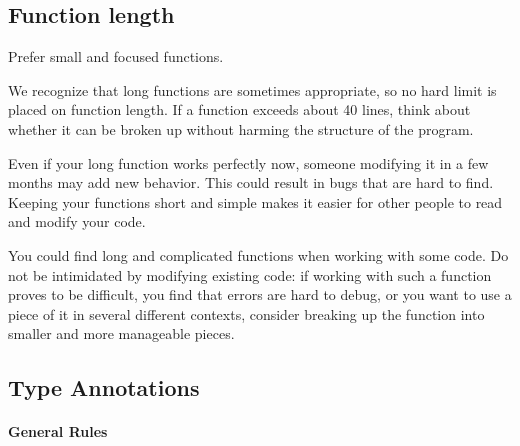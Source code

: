 \documentclass[
]{article}
\begin{document}
\subsection{Function length}

Prefer small and focused functions.

We recognize that long functions are sometimes appropriate, so no hard
limit is placed on function length. If a function exceeds about 40
lines, think about whether it can be broken up without harming the
structure of the program.

Even if your long function works perfectly now, someone modifying it in
a few months may add new behavior. This could result in bugs that are
hard to find. Keeping your functions short and simple makes it easier
for other people to read and modify your code.

You could find long and complicated functions when working with some
code. Do not be intimidated by modifying existing code: if working with
such a function proves to be difficult, you find that errors are hard to
debug, or you want to use a piece of it in several different contexts,
consider breaking up the function into smaller and more manageable
pieces.

\subsection{Type Annotations}

\paragraph{General Rules}
\end{document}
